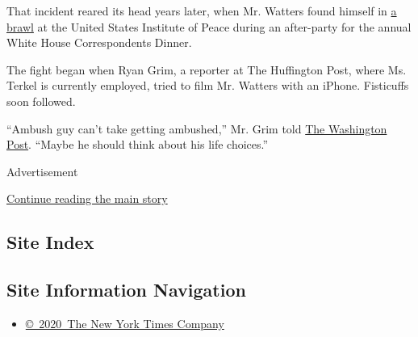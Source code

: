 That incident reared its head years later, when Mr. Watters found
himself in
\href{https://www.washingtonpost.com/news/reliable-source/wp/2016/05/01/nerdy-fight-breaks-out-at-whcd-afterparty-between-fox-news-and-huffington-post-reporters/}{a
brawl} at the United States Institute of Peace during an after-party for
the annual White House Correspondents Dinner.

The fight began when Ryan Grim, a reporter at The Huffington Post, where
Ms. Terkel is currently employed, tried to film Mr. Watters with an
iPhone. Fisticuffs soon followed.

``Ambush guy can't take getting ambushed,'' Mr. Grim told
\href{https://www.washingtonpost.com/news/reliable-source/wp/2016/05/01/nerdy-fight-breaks-out-at-whcd-afterparty-between-fox-news-and-huffington-post-reporters/}{The
Washington Post}. ``Maybe he should think about his life choices.''

Advertisement

\protect\hyperlink{after-bottom}{Continue reading the main story}

\hypertarget{site-index}{%
\subsection{Site Index}\label{site-index}}

\hypertarget{site-information-navigation}{%
\subsection{Site Information
Navigation}\label{site-information-navigation}}

\begin{itemize}
\tightlist
\item
  \href{https://help.nytimes3xbfgragh.onion/hc/en-us/articles/115014792127-Copyright-notice}{©~2020~The
  New York Times Company}
\end{itemize}

